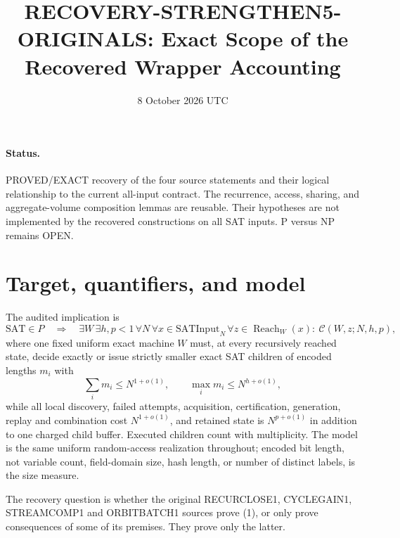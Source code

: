 \documentclass[11pt]{article}
\title{RECOVERY-STRENGTHEN5-ORIGINALS: Exact Scope of the Recovered Wrapper Accounting}
\date{8 October 2026 UTC}
\begin{document}
\sloppy\maketitle

\paragraph{Status.}
PROVED/EXACT recovery of the four source statements and their logical
relationship to the current all-input contract.  The recurrence, access,
sharing, and aggregate-volume composition lemmas are reusable.  Their
hypotheses are not implemented by the recovered constructions on all SAT
inputs.  P versus NP remains OPEN.

\section{Target, quantifiers, and model}
The audited implication is
\[
 \mathrm{SAT}\in P\quad\Longrightarrow\quad
 \exists W\,\exists h,p<1\,\forall N\,\forall x\in\mathrm{SATInput}_N
 \,\forall z\in\operatorname{Reach}_W(x):\ \mathcal C(W,z;N,h,p),
 \tag{1}
\]
where one fixed uniform exact machine $W$ must, at every recursively reached
state, decide exactly or issue strictly smaller exact SAT children of encoded
lengths $m_i$ with
\[
 \sum_i m_i\le N^{1+o(1)},\qquad
 \max_i m_i\le N^{h+o(1)},
 \tag{2}
\]
while all local discovery, failed attempts, acquisition, certification,
generation, replay and combination cost $N^{1+o(1)}$, and retained state is
$N^{p+o(1)}$ in addition to one charged child buffer.  Executed children count
with multiplicity.  The model is the same uniform random-access realization
throughout; encoded bit length, not variable count, field-domain size, hash
length, or number of distinct labels, is the size measure.

The recovery question is whether the original RECURCLOSE1, CYCLEGAIN1,
STREAMCOMP1 and ORBITBATCH1 sources prove (1), or only prove consequences of
some of its premises.  They prove only the latter.
\end{document}
